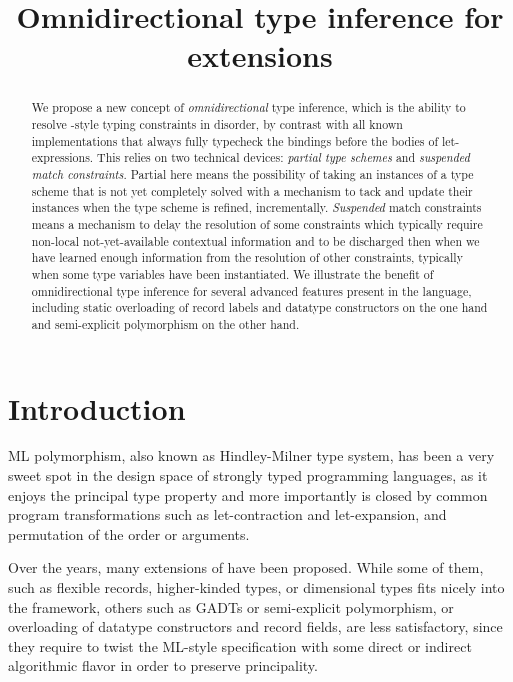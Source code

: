 \documentclass[acmsmall,screen,nonacm]{acmart}
\title{Omnidirectional type inference for \ML extensions}
\begin{document}
\begin{abstract}
We propose a new concept of \emph{omnidirectional} type inference, which is
the ability to resolve \ML-style typing constraints in disorder, by
contrast with all known implementations that always fully typecheck the
bindings before the bodies of let-expressions.
%
This relies on two technical devices: \emph{partial type schemes}
and \emph{suspended match constraints}. Partial here means  the
possibility of taking an instances of a type scheme that is not yet
completely solved with a mechanism to tack and update their instances when
the type scheme is refined, incrementally.
\emph{Suspended} match constraints means a mechanism to delay the resolution of
some constraints which typically require non-local not-yet-available
contextual information and to be discharged then when we have learned enough
information from the resolution of other constraints, typically when some type
variables have been instantiated.
%
We illustrate the benefit of omnidirectional type inference for several
advanced features present in the \OCaml language, including static
overloading of record labels and datatype constructors on the one hand and
semi-explicit polymorphism on the other hand.
\end{abstract}

\maketitle


\section{Introduction}

ML polymorphism, also known as Hindley-Milner type system, has been a very
sweet spot in the design space of strongly typed programming languages, as
it enjoys the principal type property and more importantly is closed by
common program transformations such as let-contraction and let-expansion,
and permutation of the order or arguments.

Over the years, many extensions of \ML have been proposed.  While some of
them, such as flexible records, higher-kinded types, or dimensional types
fits nicely into the \ML framework, others such as GADTs or semi-explicit
polymorphism, or overloading of datatype constructors and record fields, are
less satisfactory, since they require to twist the ML-style specification
with some direct or indirect algorithmic flavor in order to preserve
principality.
\end{document}
